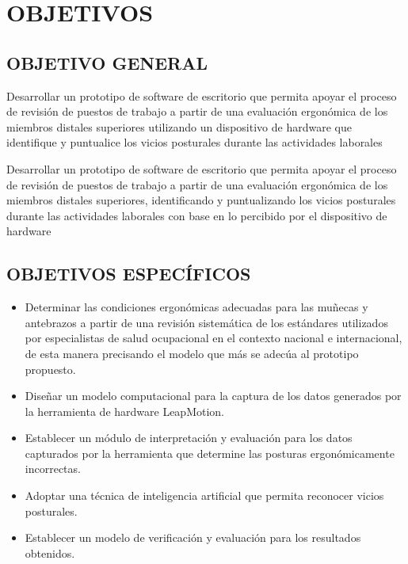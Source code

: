 \chapter{OBJETIVOS}
\section{OBJETIVO GENERAL}
Desarrollar un prototipo de software de escritorio que permita apoyar el proceso de revisión de puestos de trabajo a partir de una evaluación ergonómica de los miembros distales superiores utilizando un dispositivo de hardware que identifique y puntualice los vicios posturales durante las actividades laborales

Desarrollar un prototipo de software de escritorio que permita apoyar el proceso de revisión de puestos de trabajo a partir de una evaluación ergonómica de los miembros distales superiores, identificando y puntualizando los vicios posturales durante las actividades laborales con base en lo percibido por el dispositivo de hardware
 
\section{OBJETIVOS ESPECÍFICOS}
\begin{itemize}
    \item Determinar las condiciones ergonómicas adecuadas para las muñecas y antebrazos a partir de una revisión sistemática de los estándares utilizados por especialistas de salud ocupacional en el contexto nacional e internacional, de esta manera precisando el modelo que más se adecúa al prototipo propuesto.
    \item Diseñar un modelo computacional para la captura de los datos generados por la herramienta de hardware LeapMotion.
    \item Establecer un módulo de interpretación y evaluación para los datos capturados por la herramienta que determine las posturas ergonómicamente incorrectas.
    \item Adoptar una técnica de inteligencia artificial que permita reconocer vicios posturales.
    \item Establecer un modelo de verificación y evaluación para los resultados obtenidos.
\end{itemize}
